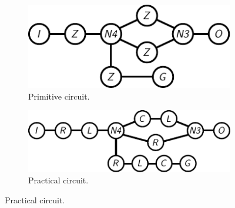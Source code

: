 \begin{figure}
\centering
\begin{subfigure}[b]{0.45\textwidth}
\centering
\includegraphics[scale=0.9]{../ch6/figures/steps_primitive}
\caption{Primitive circuit.\label{fig:ch6:steps:primitive}}
\end{subfigure}%
\hspace{0.05\columnwidth}%
\begin{subfigure}[b]{0.45\columnwidth}
\centering
\includegraphics[scale=1.10]{../ch6/figures/steps_circuit}
\caption{Practical circuit.\label{fig:ch6:steps:circuit}}
\end{subfigure}%

\vspace{0.1in}


\end{figure}
